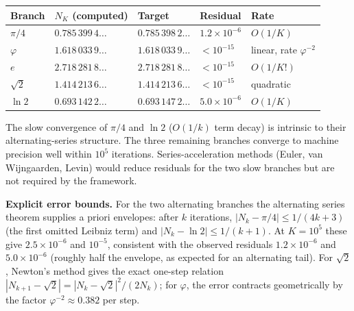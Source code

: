 \documentclass[12pt]{article}
\begin{document}
\begin{longtable}[]{@{}
  >{\raggedright\arraybackslash}p{}
  >{\raggedright\arraybackslash}p{}
  >{\raggedright\arraybackslash}p{}
  >{\raggedright\arraybackslash}p{}
  >{\raggedright\arraybackslash}p{}@{}}
\toprule\noalign{}
\begin{minipage}[b]{\linewidth}\raggedright
Branch
\end{minipage} & \begin{minipage}[b]{\linewidth}\raggedright
\(N_K\) (computed)
\end{minipage} & \begin{minipage}[b]{\linewidth}\raggedright
Target
\end{minipage} & \begin{minipage}[b]{\linewidth}\raggedright
Residual
\end{minipage} & \begin{minipage}[b]{\linewidth}\raggedright
Rate
\end{minipage} \\
\midrule\noalign{}
\endhead
\bottomrule\noalign{}
\endlastfoot
\(\pi/4\) & \(0.785\,399\,4\ldots\) & \(0.785\,398\,2\ldots\) &
\(1.2 \times 10^{-6}\) & \(O(1/K)\) \\
\(\varphi\) & \(1.618\,033\,9\ldots\) & \(1.618\,033\,9\ldots\) &
\(< 10^{-15}\) & linear, rate \(\varphi^{-2}\) \\
\(e\) & \(2.718\,281\,8\ldots\) & \(2.718\,281\,8\ldots\) &
\(< 10^{-15}\) & \(O(1/K!)\) \\
\(\sqrt{2}\) & \(1.414\,213\,6\ldots\) & \(1.414\,213\,6\ldots\) &
\(< 10^{-15}\) & quadratic \\
\(\ln 2\) & \(0.693\,142\,2\ldots\) & \(0.693\,147\,2\ldots\) &
\(5.0 \times 10^{-6}\) & \(O(1/K)\) \\
\end{longtable}

The slow convergence of \(\pi/4\) and \(\ln 2\) (\(O(1/k)\) term decay)
is intrinsic to their alternating-series structure. The three remaining
branches converge to machine precision well within \(10^5\) iterations.
Series-acceleration methods (Euler, van Wijngaarden, Levin) would reduce
residuals for the two slow branches but are not required by the
framework.

\textbf{Explicit error bounds.} For the two alternating branches the
alternating series theorem supplies a priori envelopes: after \(k\)
iterations, \(|N_k - \pi/4| \leq 1/(4k+3)\) (the first omitted Leibniz
term) and \(|N_k - \ln 2| \leq 1/(k+1)\). At \(K = 10^5\) these give
\(2.5 \times 10^{-6}\) and \(10^{-5}\), consistent with the observed
residuals \(1.2 \times 10^{-6}\) and \(5.0 \times 10^{-6}\) (roughly
half the envelope, as expected for an alternating tail). For
\(\sqrt{2}\), Newton's method gives the exact one-step relation
\(|N_{k+1} - \sqrt{2}| = |N_k - \sqrt{2}|^2 / (2N_k)\); for \(\varphi\),
the error contracts geometrically by the factor
\(\varphi^{-2} \approx 0.382\) per step.
\end{document}

